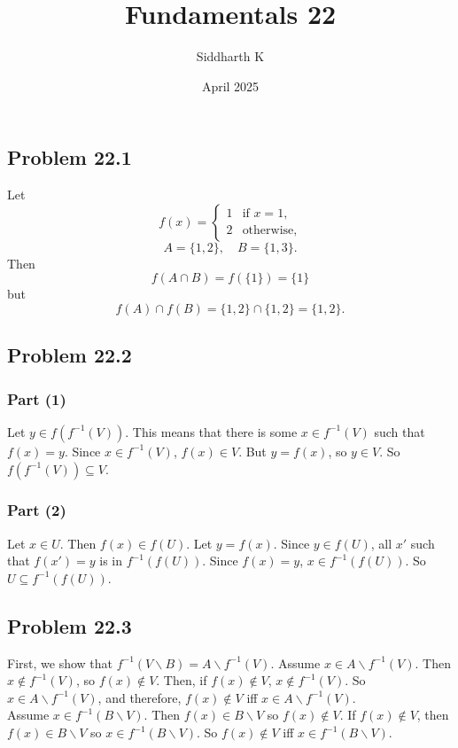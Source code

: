 \documentclass{article}
\title{Fundamentals 22}
\author{Siddharth K}
\date{April 2025}
\newcommand{\minus}{\backslash}
\begin{document}
\maketitle

\subsection*{Problem 22.1}
Let
$$f(x) = \begin{cases}
    1 & \text{if } x = 1, \\
    2 & \text{otherwise},
\end{cases}$$
$$A = \{1, 2\}, \quad B = \{1, 3\}.$$
Then
$$f(A\cap B) = f(\{1\}) = \{1\}$$
but
$$f(A) \cap f(B) = \{1, 2\} \cap \{1, 2\} = \{1, 2\}.$$

\subsection*{Problem 22.2}
\subsubsection*{Part (1)}
Let $y \in f(f^{-1}(V))$. This means that there is some $x \in f^{-1}(V)$ such that $f(x) = y$. Since $x \in f^{-1}(V)$, $f(x) \in V$. But $y = f(x)$, so $y \in V$. So $f(f^{-1}(V)) \subseteq V$.

\subsubsection*{Part (2)}
Let $x \in U$. Then $f(x) \in f(U)$. Let $y = f(x)$. Since $y \in f(U)$, all $x'$ such that $f(x') = y$ is in $f^{-1}(f(U))$. Since $f(x) = y$, $x \in f^{-1}(f(U))$. So $U \subseteq f^{-1}(f(U))$.

\subsection*{Problem 22.3}
First, we show that $f^{-1}(V \minus B) = A \minus f^{-1}(V)$. Assume $x \in A \minus f^{-1}(V)$. Then $x \not\in f^{-1}(V)$, so $f(x) \not\in V$. Then, if $f(x) \not\in V$, $x \not\in f^{-1}(V)$. So $x \in A \minus f^{-1}(V)$, and therefore, $f(x) \not \in V$ iff $x \in A \minus f^{-1}(V)$. \\

Assume $x \in f^{-1}(B \minus V)$. Then $f(x) \in B \minus V$ so $f(x) \not\in V$. If $f(x) \not\in V$, then $f(x) \in B \minus V$ so $x \in f^{-1}(B \minus V)$. So $f(x) \not\in V$ iff $x \in f^{-1}(B \minus V)$. \\
\end{document}
